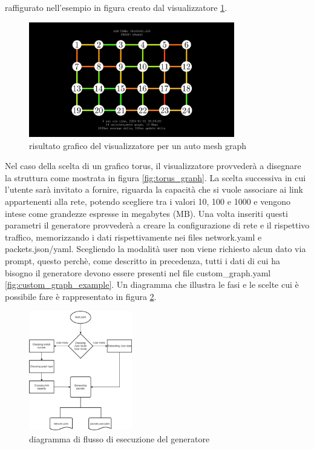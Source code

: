 \documentclass[binding=0.6cm]{sapthesis}
\begin{document}
raffigurato nell'esempio in figura creato dal visualizzatore \ref{fig:mesh_example}.
\begin{figure}[h]
    \centering
    \includegraphics[width=0.8\textwidth]{immagini/mesh_example.jpg}
    \caption{risultato grafico del visualizzatore per un auto mesh graph}
    \label{fig:mesh_example}
\end{figure}
Nel caso della scelta di un grafico torus, il visualizzatore provvederà a disegnare la struttura come mostrata in figura \ref{fig:torus_graph}.
La scelta successiva in cui l'utente sarà invitato a fornire, riguarda la capacità che si vuole associare ai link appartenenti alla rete, potendo
scegliere tra i valori 10, 100 e 1000 e vengono intese come grandezze espresse in megabytes (MB).
Una volta inseriti questi parametri il generatore provvederà a creare la configurazione di rete e il rispettivo traffico, memorizzando i dati rispettivamente
nei files network.yaml e packets.json/yaml.
Scegliendo la modalità user non viene richiesto alcun dato via prompt, questo perchè, come descritto in precedenza, tutti i dati di cui ha bisogno
il generatore devono essere presenti nel file custom\_graph.yaml \ref{fig:custom_graph_example}. Un diagramma che illustra le fasi e le
 scelte cui è possibile fare
è rappresentato in figura \ref{fig:diagramma_generatore}.   
\begin{figure}[h]
    \centering
    \includegraphics[width=0.40\textwidth]{immagini/diagramma_selezioni_config_gen.jpg}
    \caption{diagramma di flusso di esecuzione del generatore}
    \label{fig:diagramma_generatore}
\end{figure}
\end{document}
